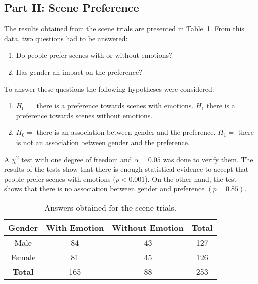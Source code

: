 \subsection{Part II: Scene Preference}

The results obtained from the scene trials are presented in Table~\ref{table:preference_selection}. From this data, two questions had to be answered:
\begin{enumerate}
	\item Do people prefer scenes with or without emotions?
	\item Has gender an impact on the preference?
\end{enumerate}
To answer these questions the following hypotheses were considered:
\begin{enumerate}
	\item $H_0 =$ there is a preference towards scenes with emotions. $H_1$ there is a preference towards scenes without emotions. 
	\item $H_0 =$ there is an association between gender and the preference. $H_1 =$ there is not an association between gender and the preference. 
\end{enumerate}
A $\chi^2$ test with one degree of freedom and $\alpha = 0.05$ was done to verify them. The results of the tests show that there is enough statistical evidence to accept that people prefer scenes with emotions ($p<0.001$). On the other hand, the test shows that there is no association between gender and preference $(p=0.85)$.

\begin{table}
\centering
		\caption{Answers obtained for the scene trials.}		
		\label{table:preference_selection}
			\begin{tabular}{|c|c|c|c|}
			\hline
			\textbf{Gender}&\textbf{With Emotion}&\textbf{Without Emotion}&\textbf{Total}\\
			\hline
			Male & 84 & 43 & 127\\
			\hline
			Female & 81 & 45 & 126\\
			\hline
			\textbf{Total} & 165 & 88 & 253\\
			\hline
			\end{tabular}
\end{table}
